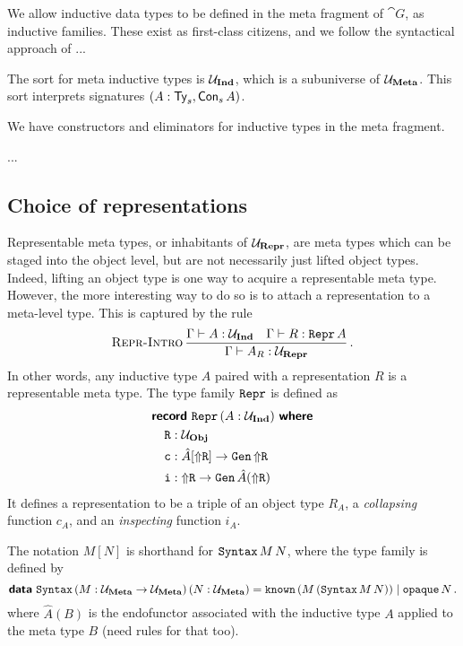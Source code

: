 We allow inductive data types to be defined in the meta fragment of $\cat{G}$,
as inductive families. These exist as first-class citizens, and we follow the
syntactical approach of \cite{Dybjer1994-zx} ...

The sort for meta inductive types is $\Ui$, which is a subuniverse of $\Um$.
This sort interprets signatures $(A : \Ty_s, \Con_s \, A)$.

We have constructors and eliminators for inductive types in the meta fragment.

...

\subsection{Choice of representations}

Representable meta types, or inhabitants of $\Ur$, are meta types which can be
staged into the object level, but are not necessarily just lifted object types.
Indeed, lifting an object type is one way to acquire a representable meta type.
However, the more interesting way to do so is to attach a representation to a
meta-level type. This is captured by the rule
\[
  \infrule[Repr-Intro]{\Gamma \vdash A : \Ui \quad \Gamma \vdash R : \defin{Repr}\,A}
  {\Gamma \vdash A_R : \Ur} \,.
\]
In other words, any inductive type $A$ paired with a representation $R$ is a
representable meta type. The type family $\Repr$ is defined as
\begin{align*}
   & \recordwhere[\,(A: \Ui)]{Repr}                                                   \\
   & \quad \defin{R} : \Uo                                                            \\
   & \quad    \defin{c} : \hat{A} [\lift{\defin R}] \to \Gen \, \lift{\defin R} \quad \\
   & \quad    \defin{i} : \lift{\defin R} \to \Gen \, \hat{A}(\lift{\defin R})
\end{align*}
It defines a representation to be a triple of an object type $R_A$, a
\emph{collapsing} function $c_A$, and an \emph{inspecting} function $i_A$.

The notation $M[N]$ is shorthand for $\defin{Syntax}\,M\,N$, where the
 type family is defined by
\[
  \data{Syntax} \,(M : \Um \to \Um)\,(N : \Um) = \defin{known} \, (M\,(\defin{Syntax}\,M\,N)) \mid \defin{opaque} \, N \,.
\]
where $\hat{A}(B)$ is the endofunctor associated with the inductive type $A$
applied to the meta type $B$ (need rules for that too).

